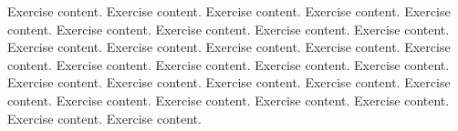 \begin{exer}
Exercise content. Exercise content. Exercise content. Exercise content. Exercise content. Exercise content. Exercise content. Exercise content. Exercise content. Exercise content.  Exercise content. Exercise content. Exercise content. Exercise content. Exercise content. Exercise content. Exercise content. Exercise content. Exercise content. Exercise content. Exercise content. Exercise content. Exercise content. Exercise content. Exercise content. Exercise content. Exercise content. Exercise content. Exercise content.

\end{exer}
